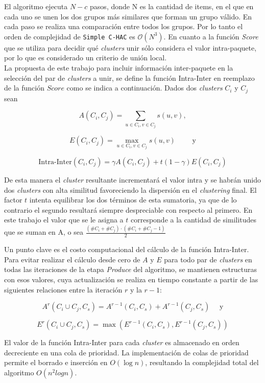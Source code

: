 El algoritmo ejecuta $N - c$ pasos, donde N es la cantidad de items, en el que en cada uno se unen los dos grupos más similares que forman un grupo válido. En cada paso se realiza una comparación entre todos los grupos. Por lo tanto el orden de complejidad de \texttt{Simple C-HAC} es $\mathcal{O}(N^{3})$. En cuanto a la función \textit{Score} que se utiliza para decidir qué {\em clusters} unir sólo considera el valor intra-paquete, por lo que es considerado un criterio de unión local.\\

La propuesta de este trabajo para incluir información inter-paquete en la selección del par de {\em clusters} a unir, se define la función Intra-Inter en reemplazo de la función $Score$ como se indica a continuación. Dados dos {\em clusters} $C_i$ y $C_j$ sean

$$A(C_i,C_j) = \sum_{u \in C_i, v \in C_j}{s(u,v)},$$

$$E(C_i,C_j)=\max_{u \in C_i, v \in C_j}{s(u,v)} \qquad \mbox{ y}$$

$$\mbox{Intra-Inter}(C_i,C_j) = \gamma A(C_i,C_j) + t (1-\gamma) E(C_i,C_j)$$

De esta manera el {\em cluster} resultante incrementará el valor intra y se habrán unido dos {\em clusters} con alta similitud favoreciendo la dispersión en el {\em clustering} final. El factor $t$ intenta equilibrar los dos términos de esta sumatoria, ya que de lo contrario el segundo resultará siempre despreciable con respecto al primero. En este trabajo el valor que se le asigna a $t$ corresponde a la cantidad de similitudes que se suman en A, o sea $\frac{(\#C_i + \#C_j) \cdot (\#C_i + \#C_j - 1)}{2}$  

Un punto clave es el costo computacional del cálculo de la función Intra-Inter. Para evitar realizar el cálculo desde cero de $A$ y $E$ para todo par de {\em clusters} en todas las iteraciones de la etapa \emph{Produce} del algoritmo, se  mantienen estructuras con esos valores, cuya actualización se realiza en tiempo constante a partir de las siguientes relaciones entre la iteración $r$ y la $r-1$:

$$A^r(C_i \cup C_j, C_s) = A^{r-1}(C_i,C_s) + A^{r-1}(C_j,C_s) \quad \mbox{ y}$$

$$E^r(C_i \cup C_j,C_s) = \max (E^{r-1}(C_i,C_s),E^{r-1}(C_j,C_s))$$

El valor de la función Intra-Inter para cada {\em cluster} es almacenado en orden decreciente en una cola de prioridad. La implementación de colas de prioridad permite el borrado e inserción en $O(\log n)$, resultando la complejidad total del algoritmo $O(n^2 log n)$.\\

